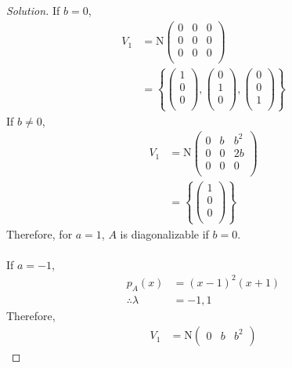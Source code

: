 \documentclass[fleqn, a4paper, 12pt]{article}
\theoremstyle{definition}
\theoremstyle{theorem}
\theoremstyle{remark}
\newcommand{\N}{\mathrm{N}}
\newenvironment{solution} %
	{\begin{proof}[Solution]\let\qed\relax}
	{\end{proof}}
\numberwithin{corollary}{theorem}
\numberwithin{equation}{theorem}
\begin{document}
\begin{solution}
	If $b = 0$,
	\begin{align*}
		V_1 &= \N
			\begin{pmatrix}
				0 & 0 & 0\\
				0 & 0 & 0\\
				0 & 0 & 0\\
			\end{pmatrix}\\
		&=
			\left\lbrace
				\begin{pmatrix}
					1\\
					0\\
					0\\
				\end{pmatrix}
				,
				\begin{pmatrix}
					0\\
					1\\
					0\\
				\end{pmatrix}
				,
				\begin{pmatrix}
					0\\
					0\\
					1\\
				\end{pmatrix}
			\right\rbrace
	\end{align*}
	If $b \neq 0$,
	\begin{align*}
		V_1 &= \N
			\begin{pmatrix}
				0 & b & b^2\\
				0 & 0 & 2b\\
				0 & 0 & 0\\
			\end{pmatrix}\\
		&=
			\left\lbrace
				\begin{pmatrix}
					1\\
					0\\
					0\\
				\end{pmatrix}
			\right\rbrace
	\end{align*}
	Therefore, for $a = 1$, $A$ is diagonalizable if $b = 0$.\\
	~\\
	If $a = -1$,
	\begin{align*}
		p_A(x) &= (x - 1)^2 (x + 1)\\
		\therefore \lambda &= -1, 1
	\end{align*}
	Therefore,
	\begin{align*}
		V_1 &= \N
			\begin{pmatrix}
				0 & b & b^2\\

\end{pmatrix}
\end{align*}
\end{solution}
\end{document}
